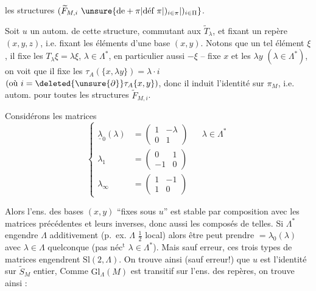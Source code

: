 les structures $(\widetilde F_{M,i}\ \unsure{\text{de}\mathbin{+}\pi|\text{déf}\ \pi|)_{i\in\pi}|)_{i\in\Pi}}$.

Soit $u$ un autom. de cette structure,
commutant aux  $\widetilde T_\lambda$, et fixant un
repère $(x,y,z)$, i.e. fixant les éléments
d'une base $(x,y)$.
  Notons que un
tel élément $\xi$,  il fixe les $T_\lambda\xi=\lambda\xi$, $\lambda\in\Lambda^*$,
en particulier aussi $-\xi$ -- 
 
 fixe $x$ et les $\lambda y$ $(\lambda\in\Lambda^*)$, on voit que il
 fixe les $\tau_A(\{x,\lambda y\})=\lambda\cdot i$
$(\text{où}\ i=\deleted{\unsure{\partial}}\tau_A\{x,y\})$, donc
il induit l'identité sur $\pi_M$, i.e.  
autom. pour toutes les structures $\widetilde F_{M,i}$.

 Considérons les matrices
\[
\left\{\begin{aligned}
\underline{\lambda}_0(\lambda)&=\begin{pmatrix}1&-\lambda\\0&1\end{pmatrix}
&&\lambda\in\Lambda^*\\
\lambda_1&=\begin{pmatrix}0&1\\-1&0\end{pmatrix}\\
\lambda_\infty&=\begin{pmatrix}1&-1\\1&0\end{pmatrix}
\end{aligned}\right.
\]

Alors l'ens. des bases $(x,y)$ ``fixes sous $u$'' est stable par composition avec les matrices
précédentes et leurs inverses, donc aussi
les composés de telles. Si $\Lambda^*$ engendre $\Lambda$
additivement (p.~ex. $\Lambda$ $\frac12$ local) alors  être
peut prendre $=\lambda_0(\lambda)$ avec $\lambda\in\Lambda$ quelconque (pas néc$^{\text{t}}$ $\lambda\in\Lambda^*$). Mais sauf erreur,
ces trois types de matrices engendrent
$\mathrm{Sl}(2,\Lambda)$. On trouve ainsi (sauf erreur!)
que $u$ est l'identité sur $\widetilde S_M$  entier,
Comme $\mathrm{Gl}_\Lambda(M)$ est transitif sur l'ens. des
repères, on trouve ainsi :

